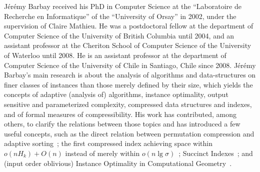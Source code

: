 \documentclass[a4paper,10pt]{article}
\begin{document}
J\'er\'emy Barbay received his PhD in Computer Science at the ``Laboratoire de Recherche en Informatique'' of the ``University of Orsay'' in 2002, under the supervision of Claire Mathieu.  He was a postdoctoral fellow at the department of Computer Science of the University of British Columbia until 2004, and an assistant professor at the Cheriton School of Computer Science of the University of Waterloo until 2008. He is an assistant professor at the department of Computer Science of the University of Chile in Santiago, Chile since 2008.
%
J\'er\'emy Barbay's main research is about the analysis of algorithms and data-structures on finer classes of instances than those merely defined by their size, which yields the concepts of adaptive (analysis of) algorithms, instance optimality, output sensitive and parameterized complexity, compressed data structures and indexes, and of formal measures of compressibility.  His work has contributed, among others, to clarify the relations between those topics and has introduced a few useful concepts, such as the direct relation between permutation compression and adaptive sorting~\cite{2013-TCS-CompressedRepresentationsOfPermutationsAndApplications-BarbayNavarro}; the first compressed index achieving space within $o(n H_k) + O(n)$ instead of merely within $o(n \lg \sigma)$~\cite{2014-Algorithmica-EfficientFullyCompressedSequenceRepresentations-BarbayClaudeGagieNavarroNekrich}; Succinct Indexes~\cite{2011-TALG-SuccinctIndexesForStringsBinaryRelationsAndMultiLabeledTrees-BarbayHeMunroRao}; and (input order oblivious) Instance Optimality in Computational Geometry~\cite{2017-JACM-InstanceOptimalGeometricAlgorithms-AfshaniBarbayChan}.
\end{document}
